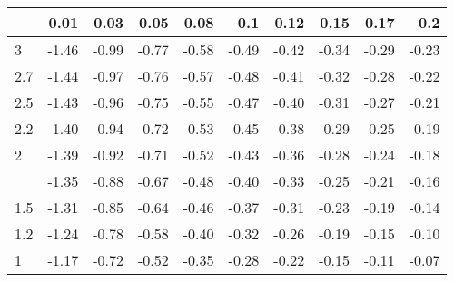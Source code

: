 
\begin{tabular}{lrrrrrrrrr}
\toprule
  & 0.01 & 0.03 & 0.05 & 0.08 & 0.1 & 0.12 & 0.15 & 0.17 & 0.2\\
\midrule
3 & -1.46 & -0.99 & -0.77 & -0.58 & -0.49 & -0.42 & -0.34 & -0.29 & -0.23\\
2.7 & -1.44 & -0.97 & -0.76 & -0.57 & -0.48 & -0.41 & -0.32 & -0.28 & -0.22\\
2.5 & -1.43 & -0.96 & -0.75 & -0.55 & -0.47 & -0.40 & -0.31 & -0.27 & -0.21\\
2.2 & -1.40 & -0.94 & -0.72 & -0.53 & -0.45 & -0.38 & -0.29 & -0.25 & -0.19\\
2 & -1.39 & -0.92 & -0.71 & -0.52 & -0.43 & -0.36 & -0.28 & -0.24 & -0.18\\
\addlinespace
1.7 & -1.35 & -0.88 & -0.67 & -0.48 & -0.40 & -0.33 & -0.25 & -0.21 & -0.16\\
1.5 & -1.31 & -0.85 & -0.64 & -0.46 & -0.37 & -0.31 & -0.23 & -0.19 & -0.14\\
1.2 & -1.24 & -0.78 & -0.58 & -0.40 & -0.32 & -0.26 & -0.19 & -0.15 & -0.10\\
1 & -1.17 & -0.72 & -0.52 & -0.35 & -0.28 & -0.22 & -0.15 & -0.11 & -0.07\\
\bottomrule
\end{tabular}
